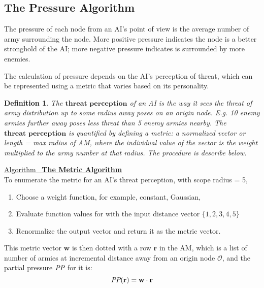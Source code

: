 \documentclass[12pt]{article}  %
\newtheorem{definition}{Definition}
\newcommand{\algtitle}[1]{\underline{Algorithm \ {\bf #1}} \vspace*{1mm}\\}
\begin{document}
\subsection{The Pressure Algorithm}

The pressure of each node from an AI's point of view is the average number of army surrounding the node. More positive pressure indicates the node is a better stronghold of the AI; more negative pressure indicates is surrounded by more enemies.

The calculation of pressure depends on the AI's perception of threat, which can be represented using a metric that varies based on its personality.

\begin{definition}
The $\textbf{threat perception}$ of an AI is the way it sees the threat of army distribution up to some radius away poses on an origin node. E.g. 10 enemy armies further away poses less threat than 5 enemy armies nearby. The $\textbf{threat perception}$ is quantified by defining a metric: a normalized vector or length = max radius of AM, where the individual value of the vector is the weight multiplied to the army number at that radius. The procedure is describe below.
\end{definition}

\algtitle{The Metric Algorithm}
To enumerate the metric for an AI's threat perception, with scope radius = 5,
\begin{enumerate}
	\item Choose a weight function, for example, constant, Gaussian,
	\item Evaluate function values for with the input distance vector $\{1,2,3,4,5\}$
	\item Renormalize the output vector and return it as the metric vector.
\end{enumerate}

This metric vector $\mathbf{w}$ is then dotted with a row $\mathbf{r}$ in the AM, which is a list of number of armies at incremental distance away from an origin node $\mathcal{O}$, and the partial pressure $\emph{PP}$ for it is:
$$\emph{PP}(\mathbf{r}) = \mathbf{w} \cdot \mathbf{r}$$
\end{document}
